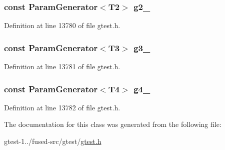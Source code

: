 \hypertarget{classtesting_1_1internal_1_1CartesianProductGenerator4_a4bd40d1fbb8c6d2895b5201e62afbe38}{
\subsubsection[{g2\-\_\-}]{\setlength{\rightskip}{0pt plus 5cm}const {\bf \-Param\-Generator}$<$\-T2$>$ {\bf g2\-\_\-}}}\label{d9/d3a/classtesting_1_1internal_1_1CartesianProductGenerator4_a4bd40d1fbb8c6d2895b5201e62afbe38}


\-Definition at line 13780 of file gtest.\-h.

\hypertarget{classtesting_1_1internal_1_1CartesianProductGenerator4_acda98d4bf8f619856fb2e0ec015b9bc8}{
\subsubsection[{g3\-\_\-}]{\setlength{\rightskip}{0pt plus 5cm}const {\bf \-Param\-Generator}$<$\-T3$>$ {\bf g3\-\_\-}}}\label{d9/d3a/classtesting_1_1internal_1_1CartesianProductGenerator4_acda98d4bf8f619856fb2e0ec015b9bc8}


\-Definition at line 13781 of file gtest.\-h.

\hypertarget{classtesting_1_1internal_1_1CartesianProductGenerator4_a1b3cef374aa9be9fbd4ed12caa7db9b5}{
\subsubsection[{g4\-\_\-}]{\setlength{\rightskip}{0pt plus 5cm}const {\bf \-Param\-Generator}$<$\-T4$>$ {\bf g4\-\_\-}}}\label{d9/d3a/classtesting_1_1internal_1_1CartesianProductGenerator4_a1b3cef374aa9be9fbd4ed12caa7db9b5}


\-Definition at line 13782 of file gtest.\-h.



\-The documentation for this class was generated from the following file\-:\begin{DoxyCompactItemize}
\item 
gtest-\/1../fused-\/src/gtest/\hyperlink{fused-src_2gtest_2gtest_8h}{gtest.\-h}\end{DoxyCompactItemize}

